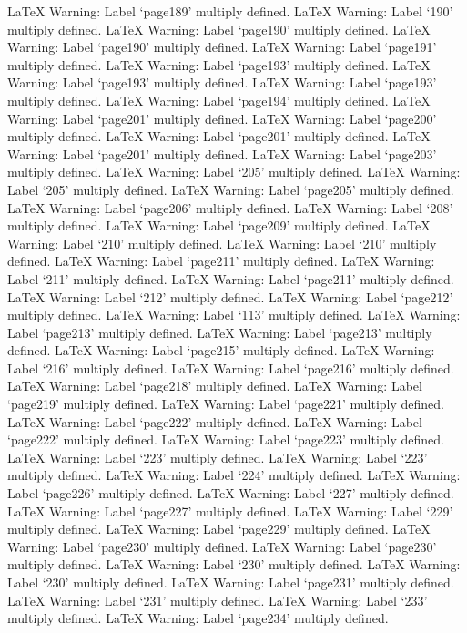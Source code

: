 LaTeX Warning: Label `page189' multiply defined.
LaTeX Warning: Label `190' multiply defined.
LaTeX Warning: Label `page190' multiply defined.
LaTeX Warning: Label `page190' multiply defined.
LaTeX Warning: Label `page191' multiply defined.
LaTeX Warning: Label `page193' multiply defined.
LaTeX Warning: Label `page193' multiply defined.
LaTeX Warning: Label `page193' multiply defined.
LaTeX Warning: Label `page194' multiply defined.
LaTeX Warning: Label `page201' multiply defined.
LaTeX Warning: Label `page200' multiply defined.
LaTeX Warning: Label `page201' multiply defined.
LaTeX Warning: Label `page201' multiply defined.
LaTeX Warning: Label `page203' multiply defined.
LaTeX Warning: Label `205' multiply defined.
LaTeX Warning: Label `205' multiply defined.
LaTeX Warning: Label `page205' multiply defined.
LaTeX Warning: Label `page206' multiply defined.
LaTeX Warning: Label `208' multiply defined.
LaTeX Warning: Label `page209' multiply defined.
LaTeX Warning: Label `210' multiply defined.
LaTeX Warning: Label `210' multiply defined.
LaTeX Warning: Label `page211' multiply defined.
LaTeX Warning: Label `211' multiply defined.
LaTeX Warning: Label `page211' multiply defined.
LaTeX Warning: Label `212' multiply defined.
LaTeX Warning: Label `page212' multiply defined.
LaTeX Warning: Label `113' multiply defined.
LaTeX Warning: Label `page213' multiply defined.
LaTeX Warning: Label `page213' multiply defined.
LaTeX Warning: Label `page215' multiply defined.
LaTeX Warning: Label `216' multiply defined.
LaTeX Warning: Label `page216' multiply defined.
LaTeX Warning: Label `page218' multiply defined.
LaTeX Warning: Label `page219' multiply defined.
LaTeX Warning: Label `page221' multiply defined.
LaTeX Warning: Label `page222' multiply defined.
LaTeX Warning: Label `page222' multiply defined.
LaTeX Warning: Label `page223' multiply defined.
LaTeX Warning: Label `223' multiply defined.
LaTeX Warning: Label `223' multiply defined.
LaTeX Warning: Label `224' multiply defined.
LaTeX Warning: Label `page226' multiply defined.
LaTeX Warning: Label `227' multiply defined.
LaTeX Warning: Label `page227' multiply defined.
LaTeX Warning: Label `229' multiply defined.
LaTeX Warning: Label `page229' multiply defined.
LaTeX Warning: Label `page230' multiply defined.
LaTeX Warning: Label `page230' multiply defined.
LaTeX Warning: Label `230' multiply defined.
LaTeX Warning: Label `230' multiply defined.
LaTeX Warning: Label `page231' multiply defined.
LaTeX Warning: Label `231' multiply defined.
LaTeX Warning: Label `233' multiply defined.
LaTeX Warning: Label `page234' multiply defined.
